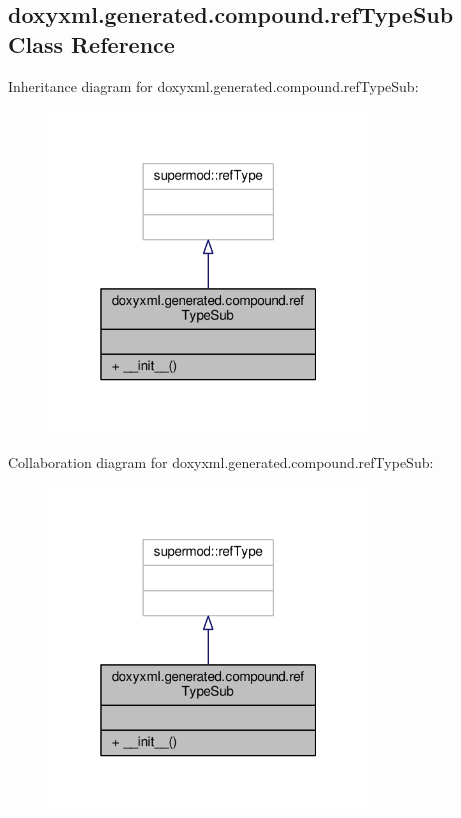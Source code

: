 \subsection{doxyxml.\+generated.\+compound.\+ref\+Type\+Sub Class Reference}
\label{classdoxyxml_1_1generated_1_1compound_1_1refTypeSub}


Inheritance diagram for doxyxml.\+generated.\+compound.\+ref\+Type\+Sub\+:
\nopagebreak
\begin{figure}[H]
\begin{center}
\leavevmode
\includegraphics[width=241pt]{df/d1b/classdoxyxml_1_1generated_1_1compound_1_1refTypeSub__inherit__graph}
\end{center}
\end{figure}


Collaboration diagram for doxyxml.\+generated.\+compound.\+ref\+Type\+Sub\+:
\nopagebreak
\begin{figure}[H]
\begin{center}
\leavevmode
\includegraphics[width=241pt]{dc/dcd/classdoxyxml_1_1generated_1_1compound_1_1refTypeSub__coll__graph}
\end{center}
\end{figure}
